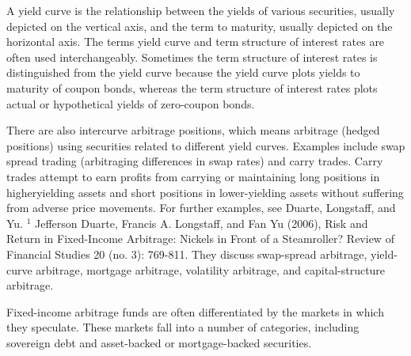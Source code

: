 \documentclass[11pt]{article}
\begin{document}
A yield curve is the relationship between the yields of various securities, usually depicted on the vertical axis, and the term to maturity, usually depicted on the horizontal axis. The terms yield curve and term structure of interest rates are often used interchangeably. Sometimes the term structure of interest rates is distinguished from the yield curve because the yield curve plots yields to maturity of coupon bonds, whereas the term structure of interest rates plots actual or hypothetical yields of zero-coupon bonds.

There are also intercurve arbitrage positions, which means arbitrage (hedged positions) using securities related to different yield curves. Examples include swap spread trading (arbitraging differences in swap rates) and carry trades. Carry trades attempt to earn profits from carrying or maintaining long positions in higheryielding assets and short positions in lower-yielding assets without suffering from adverse price movements. For further examples, see Duarte, Longstaff, and Yu. ${ }^{1}$ Jefferson Duarte, Francis A. Longstaff, and Fan Yu (2006), Risk and Return in Fixed-Income Arbitrage: Nickels in Front of a Steamroller? Review of Financial Studies 20 (no. 3): 769-811. They discuss swap-spread arbitrage, yield-curve arbitrage, mortgage arbitrage, volatility arbitrage, and capital-structure arbitrage.

Fixed-income arbitrage funds are often differentiated by the markets in which they speculate. These markets fall into a number of categories, including sovereign debt and asset-backed or mortgage-backed securities.
\end{document}
